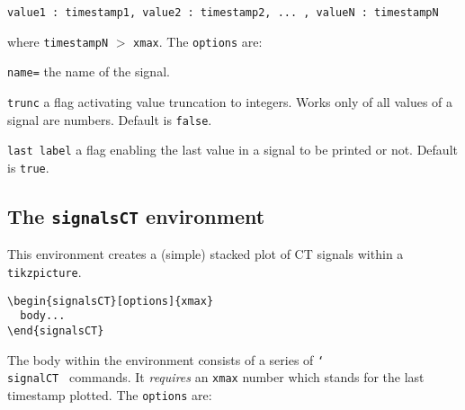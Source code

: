 \begin{verbatim}
value1 : timestamp1, value2 : timestamp2, ... , valueN : timestampN
\end{verbatim}

\noindent where \texttt{timestampN} $>$ \texttt{xmax}. The \texttt{options} are:

\begin{optionslist}
\item \texttt{name=} the name of the signal.
\item \texttt{trunc} a flag activating value truncation to integers. Works only of all values of a signal are numbers. Default is \texttt{false}.
\item \texttt{last label} a flag enabling the last value in a signal to be printed or not. Default is \texttt{true}.
\end{optionslist}


\subsection{The \texttt{signalsCT} environment}
\label{sec:plot-signalsDE}

This environment creates a (simple) stacked plot of CT signals within a \texttt{tikzpicture}.

\begin{verbatim}
\begin{signalsCT}[options]{xmax}
  body...
\end{signalsCT}
\end{verbatim}

The body within the environment consists of a series of \texttt{\char`\\signalCT } commands. It \emph{requires} an \texttt{xmax} number which stands for the last timestamp plotted. The \texttt{options} are:

